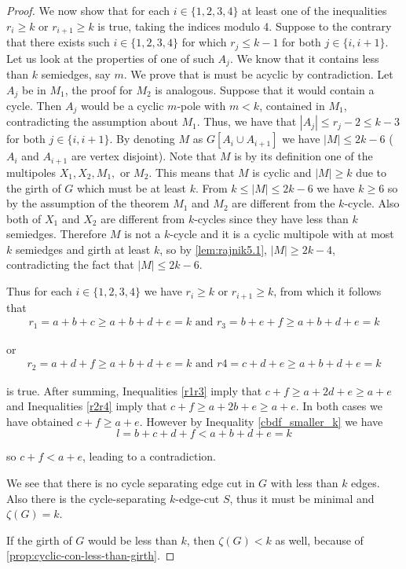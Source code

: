 \documentclass[12pt, twoside]{book}
\begin{document}
\begin{proof}
	We now show that for each $i\in\{1,2,3,4\}$ at least one of the inequalities $r_i\geq k$ or $r_{i+1}\geq k$ is true, taking the indices modulo 4. Suppose to the contrary that there exists such $i\in\{1,2,3,4\}$ for which $r_j\leq k-1$ for both $j\in\{i, i+1\}$. Let us look at the properties of one of such $A_j$. We know that it contains less than $k$ semiedges, say $m$. We prove that is must be acyclic by contradiction. Let $A_j$ be in $M_1$, the proof for $M_2$ is analogous. Suppose that it would contain a cycle. Then $A_j$ would be a cyclic $m$-pole with $m<k$, contained in $M_1$, contradicting the assumption about $M_1$. Thus, we have that $|A_j|\leq r_j-2\leq k-3$  for both $j\in \{i, i+1\}$. By denoting $M$ as $G[A_i\cup A_{i+1}]$ we have $|M|\leq 2k-6$ ($A_i$ and $A_{i+1}$ are vertex disjoint). Note that $M$ is by its definition one of the multipoles $X_1, X_2, M_1,$ or $M_2$. This means that $M$ is cyclic and $|M|\geq k$ due to the girth of $G$ which must be at least $k$. From $k\leq |M|\leq 2k-6$ we have $k\geq 6$ so by the assumption of the theorem $M_1$ and $M_2$ are different from the $k$-cycle. Also both of $X_1$ and $X_2$ are different from $k$-cycles since they have less than $k$ semiedges. Therefore $M$ is not a $k$-cycle and it is a cyclic multipole with at most $k$ semiedges and girth at least $k$, so by \cref{lem:rajnik5.1}, $|M| \geq 2k - 4$, contradicting the fact that $|M|\leq 2k-6$.
	
	Thus for each $i\in\{1,2,3,4\}$ we have $r_i\geq k$ or $r_{i+1}\geq k$, from which it follows that
	\begin{align}
		r_1 =a+b+c\geq a+b+d+e=k \text{ and } r_3 =b+e+f \geq a+b+d+e=k\label{r1r3}
	\end{align}
	
	or
	\begin{align}
		r_2 =a+d+f \geq a+b+d+e=k \text{ and } r4 =c+d+e\geq a+b+d+e=k\label{r2r4}
	\end{align}
	
	is true. After summing, Inequalities \cref{r1r3} imply that $c+f\geq a+2d+e\geq a+e$ and Inequalities \cref{r2r4} imply that $c+f\geq a+2b+e\geq a+e$. In both cases we have obtained $c+f\geq a+e$. However by Inequality \cref{cbdf_smaller_k} we have 
	$$l=b+c+d+f<a+b+d+e=k$$
	
	so $c+f<a+e$, leading to a contradiction.
	
	We see that there is no cycle separating edge cut in $G$ with less than $k$ edges. Also there is the cycle-separating $k$-edge-cut $S$, thus it must be minimal and $\zeta(G)=k$.
	
	If the girth of $G$ would be less than $k$, then $\zeta(G)<k$ as well, because of \cref{prop:cyclic-con-less-than-girth}.
\end{proof}
\end{document}
